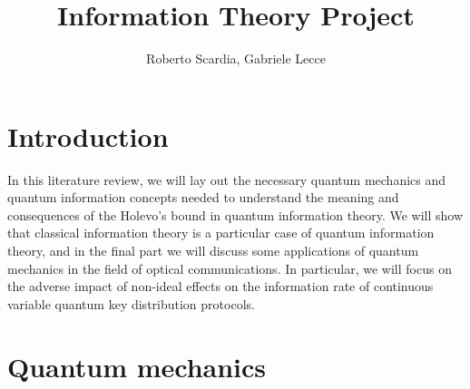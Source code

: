 \documentclass[journal, letterpaper]{IEEEtran}
\begin{document}
    
	\title{%
                Information Theory Project
            }

	\author{Roberto Scardia, Gabriele Lecce}
	\maketitle

\section{Introduction}
In this literature review, we will lay out the necessary quantum mechanics and quantum information concepts needed to understand the meaning and consequences of the Holevo's bound in quantum information theory. We will show that classical information theory is a particular case of quantum information theory, and in the final part we will discuss some applications of quantum mechanics in the field of optical communications. In particular, we will focus on the adverse impact of non-ideal effects on the information rate of continuous variable quantum key distribution protocols.
    
\section{Quantum mechanics}
\end{document}
